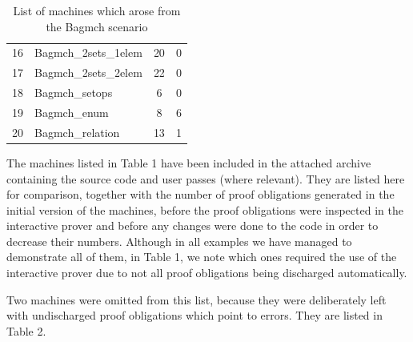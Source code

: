 \documentclass[12pt,journal,duplex]{IEEEtran}
\begin{document}
\begin{table}[h]
\begin{tabular}{@{}rlcc@{}}
	16                          & Bagmch\_2sets\_1elem        & 20                                                                           & 0                                                                                       \\
	17                          & Bagmch\_2sets\_2elem        & 22                                                                           & 0                                                                                       \\
	18                          & Bagmch\_setops              & 6                                                                            & 0                                                                                       \\
	19                          & Bagmch\_enum                & 8                                                                            & 6                                                                                       \\
	20                          & Bagmch\_relation            & 13                                                                           & 1                                                                                       \\ \bottomrule
\end{tabular}

	\caption{List of machines which arose from the Bagmch scenario}
\end{table}


	The machines listed in Table 1 have been included in the attached archive containing the source code and user passes (where relevant). They are listed here for comparison, together with the number of proof obligations generated in the initial version of the machines, before the proof obligations were inspected in the interactive prover and before any changes were done to the code in order to decrease their numbers. Although in all examples we have managed to demonstrate all of them, in Table 1, we note which ones required the use of the interactive prover due to not all proof obligations being discharged automatically.

	Two machines were omitted from this list, because they were deliberately left with undischarged proof obligations which point to errors. They are listed in Table 2.
\end{document}
